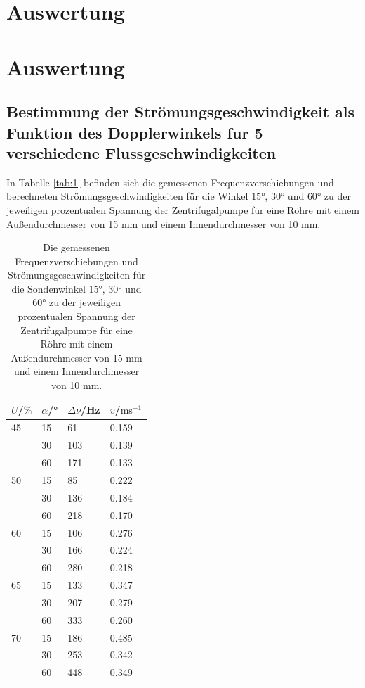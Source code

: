 \section{Auswertung}
\label{sec:Auswertung}


\section{Auswertung}
\subsection{Bestimmung der Strömungsgeschwindigkeit als Funktion des Dopplerwinkels fur 5 verschiedene Flussgeschwindigkeiten}
In Tabelle \autoref{tab:1} befinden sich die gemessenen Frequenzverschiebungen und berechneten Strömungsgeschwindigkeiten für die Winkel $15$°, $30$° und $60$° zu der jeweiligen prozentualen Spannung der Zentrifugalpumpe für eine Röhre mit einem Außendurchmesser von 15 mm und einem Innendurchmesser von 10 mm.
\begin{table}[H]
  \centering
  \caption{Die gemessenen Frequenzverschiebungen und Strömungsgeschwindigkeiten für die Sondenwinkel 15°, 30° und 60° zu der jeweiligen prozentualen Spannung der Zentrifugalpumpe für eine Röhre mit einem Außendurchmesser von 15 mm und einem Innendurchmesser von 10 mm.}
  \begin{tabular}{l|l|l|l}
  $U$/$\%$ & $\alpha$/° & $\Delta\nu$/Hz & $v$/$\textrm{ms}^{-1}$\\\hline
  45 & 15 & 61 & 0.159\\
     & 30 & 103 & 0.139\\
     & 60 & 171 & 0.133\\\hline
  50 & 15 & 85 & 0.222\\
     & 30 & 136 & 0.184\\
     & 60 & 218 & 0.170\\\hline
  60 & 15 & 106 & 0.276\\
     & 30 & 166 & 0.224\\
     & 60 & 280 & 0.218\\\hline
  65 & 15 & 133 & 0.347\\
     & 30 & 207 & 0.279\\
     & 60 & 333 & 0.260\\\hline
  70 & 15 & 186 & 0.485\\
     & 30 & 253 & 0.342\\
     & 60 & 448 & 0.349\\\hline
  \end{tabular}
  \label{tab:1}
\end{table}
